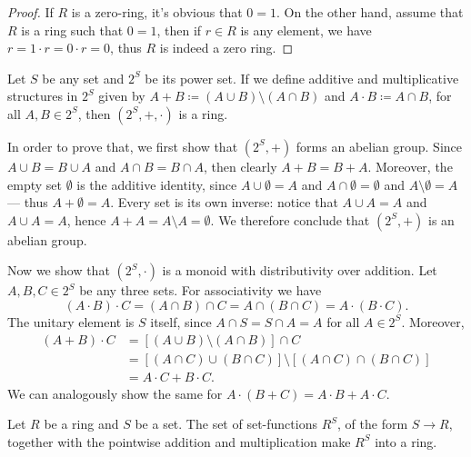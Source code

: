 %
\begin{proof}
    If \(R\) is a zero-ring, it's obvious that \(0 = 1\). On the other hand, assume
    that \(R\) is a ring such that \(0 = 1\), then if \(r \in R\) is any element, we
    have \(r = 1 \cdot r = 0 \cdot r = 0\), thus \(R\) is indeed a zero ring.
\end{proof}
%

%
\begin{example}
    \label{exp:power-set-ring}
    Let \(S\) be any set and \(2^S\) be its power set. If we define additive and
    multiplicative structures in \(2^S\) given by
    \(A + B \coloneq (A \cup B) \setminus (A \cap B)\) and
    \(A \cdot B \coloneq A \cap B\), for all \(A, B \in 2^S\), then
    \((2^S, +, \cdot)\) is a ring.

    In order to prove that, we first show that \((2^S, +)\) forms an abelian
    group. Since \(A \cup B = B \cup A\) and \(A \cap B = B \cap A\), then clearly
    \(A + B = B + A\). Moreover, the empty set \(\emptyset\) is the additive
    identity, since \(A \cup \emptyset = A\) and \(A \cap \emptyset = \emptyset\)
    and \(A \setminus \emptyset = A\) --- thus \(A + \emptyset = A\). Every set is
    its own inverse: notice that \(A \cup A = A\) and \(A \cup A = A\), hence
    \(A + A = A \setminus A = \emptyset\). We therefore conclude that \((2^S, +)\)
    is an abelian group.

    Now we show that \((2^S, \cdot)\) is a monoid with distributivity over
    addition. Let \(A, B, C \in 2^S\) be any three sets. For associativity we have
    \[
        (A \cdot B) \cdot C
        = (A \cap B) \cap C
        = A \cap (B \cap C)
        = A \cdot (B \cdot C).
    \]
    The unitary element is \(S\) itself, since \(A \cap S = S \cap A = A\) for all
    \(A \in 2^S\). Moreover,
    \begin{align*}
        (A + B) \cdot C
         & = [(A \cup B) \setminus (A \cap B)] \cap C                            \\
         & = [(A \cap C) \cup (B \cap C)] \setminus [(A \cap C) \cap (B \cap C)] \\
         & = A \cdot C + B \cdot C.
    \end{align*}
    We can analogously show the same for
    \(A \cdot (B + C) = A \cdot B + A \cdot C\).
\end{example}
%

%
\begin{example}
    \label{exp:function-ring}
    Let \(R\) be a ring and \(S\) be a set. The set of set-functions \(R^S\), of the
    form \(S \to R\), together with the pointwise addition and multiplication make
    \(R^S\) into a ring.
\end{example}
%

